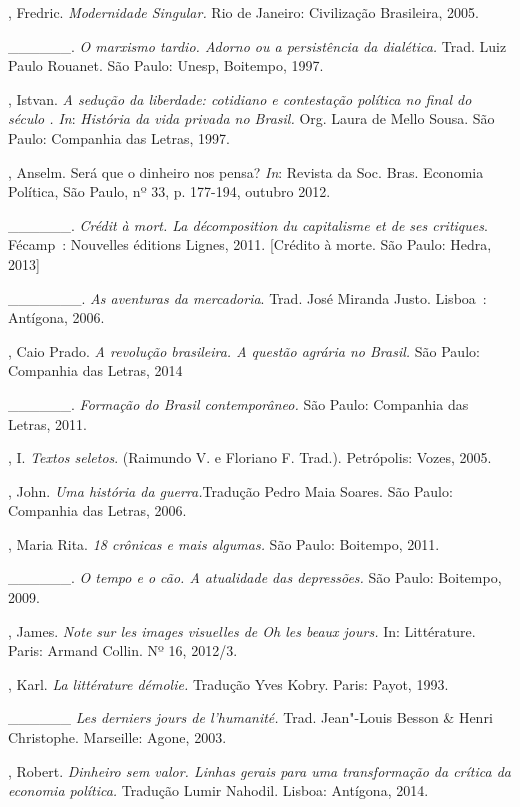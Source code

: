 \begin{Parskip}
, Fredric. \emph{Modernidade Singular.} Rio de Janeiro:
Civilização Brasileira, 2005.

\_\_\_\_\_\_. \emph{O marxismo tardio. Adorno ou a persistência da
dialética.} Trad. Luiz Paulo Rouanet. São Paulo: Unesp, Boitempo, 1997.

, Istvan. \emph{A sedução da liberdade: cotidiano e contestação
política no final do século . In}: \emph{História da vida privada
no Brasil.} Org. Laura de Mello Sousa. São Paulo: Companhia das Letras, 1997.

, Anselm. Será que o dinheiro nos pensa? \emph{In}: Revista da Soc. Bras.
Economia Política, São Paulo, nº 33, p. 177-194, outubro 2012.

\_\_\_\_\_\_. \emph{Crédit à mort. La décomposition du capitalisme et
de ses critiques}. Fécamp~: Nouvelles éditions Lignes, 2011. [Crédito
à morte. São Paulo: Hedra, 2013]

\_\_\_\_\_\_\_. \emph{As aventuras da mercadoria}. Trad. José
Miranda Justo. Lisboa~: Antígona, 2006.

, Caio Prado. \emph{A revolução brasileira. A questão agrária no
Brasil.} São Paulo: Companhia das Letras, 2014

\_\_\_\_\_\_. \emph{Formação do Brasil contemporâneo.} São Paulo:
Companhia das Letras, 2011.

, I. \emph{Textos seletos}. (Raimundo V. e Floriano F. Trad.).
Petrópolis: Vozes, 2005.

, John. \emph{Uma história da guerra.}Tradução Pedro Maia
Soares. São Paulo: Companhia das Letras, 2006.

, Maria Rita. \emph{18 crônicas e mais algumas.} São Paulo:
Boitempo, 2011.

\_\_\_\_\_\_. \emph{O tempo e o cão. A atualidade das depressões.} São
Paulo: Boitempo, 2009.

, James. \emph{Note sur les images visuelles de \emph{Oh les
beaux jours}.} In: Littérature. Paris: Armand Collin. Nº 16, 2012/3.

, Karl. \emph{La littérature démolie.} Tradução Yves Kobry.
Paris: Payot, 1993.

\_\_\_\_\_\_ \emph{Les derniers jours de l'humanité.} Trad. Jean"-Louis
Besson \& Henri Christophe. Marseille: Agone, 2003.

, Robert. \emph{Dinheiro sem valor. Linhas gerais para uma
transformação da crítica da economia política.} Tradução Lumir Nahodil.
Lisboa: Antígona, 2014.


\end{Parskip}
